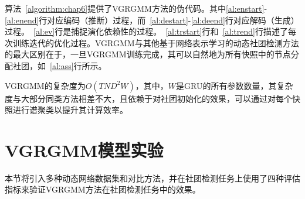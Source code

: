算法~\ref{algorithm:chap6}提供了VGRGMM方法的伪代码。其中\ref{al:enstart}-\ref{al:enend}行对应编码（推断）过程，而~\ref{al:destart}-\ref{al:deend}行对应解码（生成）过程。~\ref{al:ev}行是捕捉演化依赖性的过程。~\ref{al:trstart}行和~\ref{al:trend}行描述了每次训练迭代的优化过程。VGRGMM与其他基于网络表示学习的动态社团检测方法的最大区别在于，一旦VGRGMM训练完成，其可以自然地为所有快照中的节点分配社团，如~\ref{al:ass}行所示。




VGRGMM的复杂度为$O(TND^2W)$，其中，$W$是GRU的所有参数数量，其复杂度与大部分同类方法相差不大，且依赖于对社团初始化的效果，可以通过对每个快照进行谱聚类以提升其计算效率。

\section{VGRGMM模型实验\label{chap6:experiment}}

本节将引入多种动态网络数据集和对比方法，并在社团检测任务上使用了四种评估指标来验证VGRGMM方法在社团检测任务中的效果。

